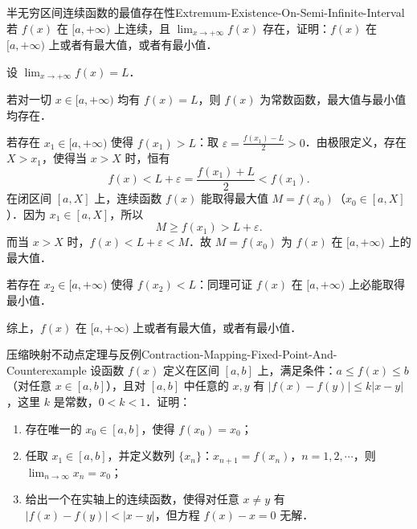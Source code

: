 \begin{problem}{半无穷区间连续函数的最值存在性}{Extremum-Existence-On-Semi-Infinite-Interval}
    若 $f(x)$ 在 $[a, +\infty)$ 上连续，且 $\lim_{x\to +\infty} f(x)$ 存在，证明：$f(x)$ 在 $[a, +\infty)$ 上或者有最大值，或者有最小值．
\end{problem}

\begin{myproof}
    设 $\lim_{x\to +\infty} f(x) = L$．

    若对一切 $x \in [a, +\infty)$ 均有 $f(x) = L$，则 $f(x)$ 为常数函数，最大值与最小值均存在．

    若存在 $x_1 \in [a, +\infty)$ 使得 $f(x_1) > L$：取 $\varepsilon = \frac{f(x_1) - L}{2} > 0$．由极限定义，存在 $X > x_1$，使得当 $x > X$ 时，恒有
    \begin{equation}
        f(x) < L + \varepsilon = \frac{f(x_1) + L}{2} < f(x_1).
    \end{equation}
    在闭区间 $[a, X]$ 上，连续函数 $f(x)$ 能取得最大值 $M = f(x_0)$（$x_0 \in [a, X]$）．因为 $x_1 \in [a, X]$，所以
    \begin{equation}
        M \geqslant f(x_1) > L + \varepsilon.
    \end{equation}
    而当 $x > X$ 时，$f(x) < L + \varepsilon < M$．故 $M = f(x_0)$ 为 $f(x)$ 在 $[a, +\infty)$ 上的最大值．

    若存在 $x_2 \in [a, +\infty)$ 使得 $f(x_2) < L$：同理可证 $f(x)$ 在 $[a, +\infty)$ 上必能取得最小值．

    综上，$f(x)$ 在 $[a, +\infty)$ 上或者有最大值，或者有最小值．
\end{myproof}

\begin{problem}{压缩映射不动点定理与反例}{Contraction-Mapping-Fixed-Point-And-Counterexample}
    设函数 $f(x)$ 定义在区间 $[a, b]$ 上，满足条件：$a \leqslant f(x) \leqslant b$（对任意 $x \in [a, b]$），且对 $[a, b]$ 中任意的 $x, y$ 有 $|f(x) - f(y)| \leqslant k|x - y|$，这里 $k$ 是常数，$0 < k < 1$．证明：
    \begin{enumerate}
        \item 存在唯一的 $x_0 \in [a, b]$，使得 $f(x_0) = x_0$；
        \item 任取 $x_1 \in [a, b]$，并定义数列 $\{x_n\}$：$x_{n+1} = f(x_n)$，$n = 1, 2, \cdots$，则 $\lim_{n\to\infty} x_n = x_0$；
        \item 给出一个在实轴上的连续函数，使得对任意 $x \neq y$ 有 $|f(x) - f(y)| < |x - y|$，但方程 $f(x) - x = 0$ 无解．
    \end{enumerate}
\end{problem}

